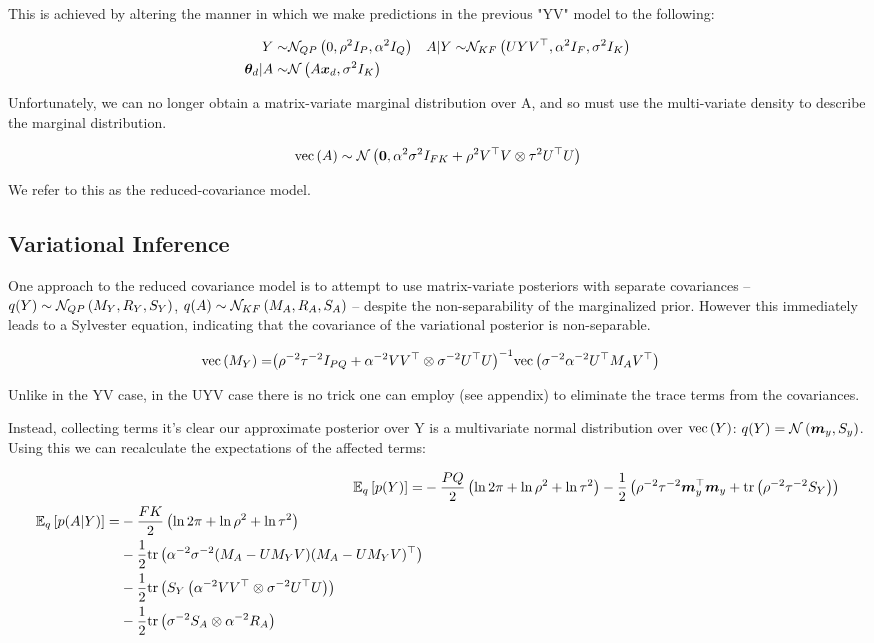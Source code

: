 This is achieved by altering the manner in which we make predictions in the previous "YV" model to the following:

\begin{align}
Y \sim & \mathcal{N}_{{QP}} \left(0, \rho^2 I_P, \alpha^2 I_Q\right) & A|Y \sim & \mathcal{N}_{{KF}} \left(UYV^\top, \alpha^2 I_F, \sigma^2 I_K\right) \\
{ \bm \theta_d } | A \sim & \mathcal{N} \left( {A\bm x_d}, {\sigma^2 I_K} \right)
\end{align}

Unfortunately, we can no longer obtain a matrix-variate marginal distribution over A, and so must use the multi-variate density to describe the marginal distribution.  

\begin{align}
\text{vec}\left(A\right) \sim \mathcal{N} \left( {\bm 0}, {\alpha^2 \sigma^2 I_{FK} + \rho^2 V^\top V \otimes \tau^2 U^\top U} \right)
\end{align}

We refer to this as the reduced-covariance model.

\subsection{Variational Inference}
One approach to the reduced covariance model is to attempt to use matrix-variate posteriors with separate covariances -- $q(Y) \sim \mathcal{N}_{{QP}} \left(M_Y, R_Y, S_Y\right)$, $q(A) \sim \mathcal{N}_{{KF}} \left(M_A, R_A, S_A\right)$ --  despite the non-separability of the marginalized prior. However this immediately leads to a Sylvester equation, indicating that the covariance of the variational posterior is non-separable.

\begin{align}
\text{vec}\left(M_Y\right) = & {\left( \rho^{-2}\tau^{-2} I_{PQ} + \alpha^{-2}V V^\top \otimes \sigma^{-2} U ^\top U \right)}^{-1}\text{vec}\left(\sigma^{-2}\alpha^{-2} U^\top M_A V^\top\right)
\end{align}

Unlike in the YV case, in the UYV case there is no trick one can employ (see appendix) to eliminate the trace terms from the covariances.

Instead, collecting terms it's clear our approximate posterior over Y is a multivariate normal distribution over $\text{vec}\left(Y\right)$: $q(Y) = \mathcal{N} \left( {\bm m_y}, {S_y} \right)$. Using this we can recalculate the expectations of the affected terms:

\begin{align}
\ex{p(Y)}{q} = & -\halve{PQ}\left(\ln 2\pi + \ln \rho^2 + \ln \tau^2\right) - \half \left(\rho^{-2}\tau^{-2} \vv{m}_y\T\vv{m}_y + \Tr{\rho^{-2}\tau^{-2} S_Y}\right) \\
\begin{split}
\ex{p(A|Y)}{q} = & -\halve{FK}\left(\ln 2\pi + \ln \rho^2 + \ln \tau^2\right) \\
 & -\half \Tr{\alpha^{-2}\sigma^{-2}(M_A - U M_Y V)(M_A - U M_Y V)\T} \\
 & -\half \Tr{S_Y \left(\alpha^{-2}V V\T \otimes \sigma^{-2}U \T U\right)} \\
 & -\half \Tr{\sigma^{-2}S_A\otimes \alpha^{-2}R_A}
 \label{eqn:free_enery_u_and_v}
\end{split}
\end{align}

